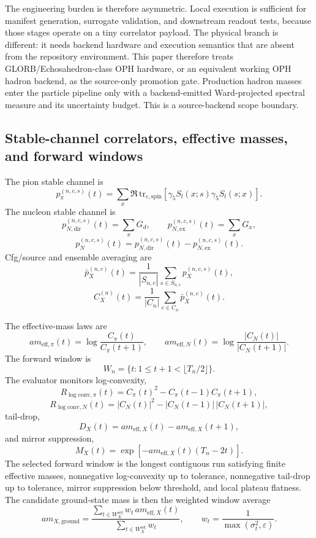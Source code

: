 \documentclass[11pt]{article}
\begin{document}
The engineering burden is therefore asymmetric. Local execution is sufficient for manifest
generation, surrogate validation, and downstream readout tests, because those stages operate on a
tiny correlator payload. The physical branch is different: it needs backend hardware and execution
semantics that are absent from the repository environment. This paper therefore treats
GLORB/Echosahedron-class OPH hardware, or an equivalent working OPH hadron backend, as the
source-only promotion gate. Production hadron masses enter the particle pipeline only with a
backend-emitted Ward-projected spectral measure and its uncertainty budget. This is a
source-backend scope boundary.

\subsection{Stable-channel correlators, effective masses, and forward windows}

The pion stable channel is
\[
p_\pi^{(n,c,s)}(t)
=
\sum_x \Re\,\mathrm{tr}_{c,\mathrm{spin}}
\left[
\gamma_5 S_l(x;s)\gamma_5 S_l(s;x)
\right].
\]
The nucleon stable channel is
\[
p_{N,\mathrm{dir}}^{(n,c,s)}(t) = \sum_x G_d,
\qquad
p_{N,\mathrm{ex}}^{(n,c,s)}(t) = \sum_x G_x,
\]
\[
p_N^{(n,c,s)}(t)
=
p_{N,\mathrm{dir}}^{(n,c,s)}(t) - p_{N,\mathrm{ex}}^{(n,c,s)}(t).
\]
Cfg/source and ensemble averaging are
\[
\bar p_X^{(n,c)}(t)
=
\frac{1}{|S_{n,c}|}\sum_{s\in S_{n,c}} p_X^{(n,c,s)}(t),
\]
\[
C_X^{(n)}(t)
=
\frac{1}{|C_n|}\sum_{c\in C_n} \bar p_X^{(n,c)}(t).
\]

The effective-mass laws are
\[
a m_{\mathrm{eff},\pi}(t)
=
\log\!\frac{C_\pi(t)}{C_\pi(t+1)},
\qquad
a m_{\mathrm{eff},N}(t)
=
\log\!\frac{|C_N(t)|}{|C_N(t+1)|}.
\]
The forward window is
\[
W_n = \{ t : 1 \le t+1 < \lfloor T_n/2 \rfloor \}.
\]
The evaluator monitors log-convexity,
\[
R_{\log\mathrm{conv},\pi}(t)
=
C_\pi(t)^2 - C_\pi(t-1)C_\pi(t+1),
\]
\[
R_{\log\mathrm{conv},N}(t)
=
|C_N(t)|^2 - |C_N(t-1)|\,|C_N(t+1)|,
\]
tail-drop,
\[
D_X(t)
=
a m_{\mathrm{eff},X}(t) - a m_{\mathrm{eff},X}(t+1),
\]
and mirror suppression,
\[
M_X(t)
=
\exp[-a m_{\mathrm{eff},X}(t)(T_n - 2t)].
\]
The selected forward window is the longest contiguous run satisfying finite effective masses,
nonnegative log-convexity up to tolerance, nonnegative tail-drop up to tolerance, mirror
suppression below threshold, and local plateau flatness. The candidate ground-state mass is then
the weighted window average
\[
a m_{X,\mathrm{ground}}
=
\frac{\sum_{t\in W_X^{\mathrm{sel}}} w_t\,a m_{\mathrm{eff},X}(t)}
{\sum_{t\in W_X^{\mathrm{sel}}} w_t},
\qquad
w_t = \frac{1}{\max(\sigma_t^2,\varepsilon)}.
\]
\end{document}
